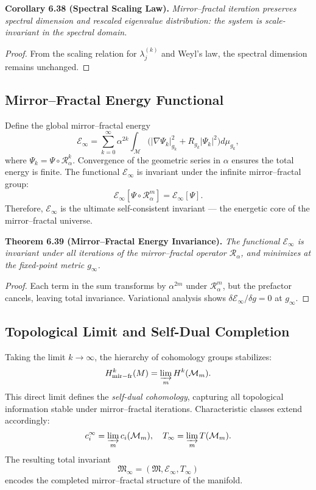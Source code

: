 \noindent
\textbf{Corollary 6.38 (Spectral Scaling Law).}
\emph{Mirror–fractal iteration preserves spectral dimension and
rescaled eigenvalue distribution:
the system is scale-invariant in the spectral domain.}

\begin{proof}
From the scaling relation for \(\lambda_{j}^{(k)}\)
and Weyl’s law, the spectral dimension remains unchanged.
\end{proof}

\subsection{Mirror–Fractal Energy Functional}\relax \hspace{0pt}

Define the global mirror–fractal energy
\[
\mathcal{E}_{\infty}
=\sum_{k=0}^{\infty}\alpha^{2k}
\int_{\mathcal{M}}
\big(|\nabla\Psi_{k}|_{g_{k}}^{2}
+R_{g_{k}}|\Psi_{k}|^{2}\big)d\mu_{g_{k}},
\]
where \(\Psi_{k}=\Psi\circ\mathcal{R}_{\alpha}^{k}\).
Convergence of the geometric series in \(\alpha\)
ensures the total energy is finite.
The functional \(\mathcal{E}_{\infty}\)
is invariant under the infinite mirror–fractal group:
\[
\mathcal{E}_{\infty}[\Psi\circ\mathcal{R}_{\alpha}^{m}]
=\mathcal{E}_{\infty}[\Psi].
\]
Therefore, \(\mathcal{E}_{\infty}\)
is the ultimate self-consistent invariant
— the energetic core of the mirror–fractal universe.

\noindent
\textbf{Theorem 6.39 (Mirror–Fractal Energy Invariance).}
\emph{The functional \(\mathcal{E}_{\infty}\)
is invariant under all iterations of the mirror–fractal operator
\(\mathcal{R}_{\alpha}\),
and minimizes at the fixed-point metric \(g_{\infty}\).}

\begin{proof}
Each term in the sum transforms by \(\alpha^{2m}\)
under \(\mathcal{R}_{\alpha}^{m}\),
but the prefactor cancels, leaving total invariance.
Variational analysis shows
\(\delta\mathcal{E}_{\infty}/\delta g=0\) at \(g_{\infty}\).
\end{proof}

\subsection{Topological Limit and Self-Dual Completion}\relax \hspace{0pt}

Taking the limit \(k\to\infty\),
the hierarchy of cohomology groups stabilizes:
\[
H_{\mathrm{mir-fr}}^{k}(M)
=\varinjlim_{m}H^{k}(\mathcal{M}_{m}).
\]
This direct limit defines the
\emph{self-dual cohomology},
capturing all topological information stable under mirror–fractal iterations.
Characteristic classes extend accordingly:
\[
c_{i}^{\infty}
=\varinjlim_{m}c_{i}(\mathcal{M}_{m}),
\quad
T_{\infty}
=\varinjlim_{m}T(\mathcal{M}_{m}).
\]
The resulting total invariant
\[
\mathfrak{M}_{\infty}
=(\mathfrak{M},\mathcal{E}_{\infty},T_{\infty})
\]
encodes the completed mirror–fractal structure of the manifold.

